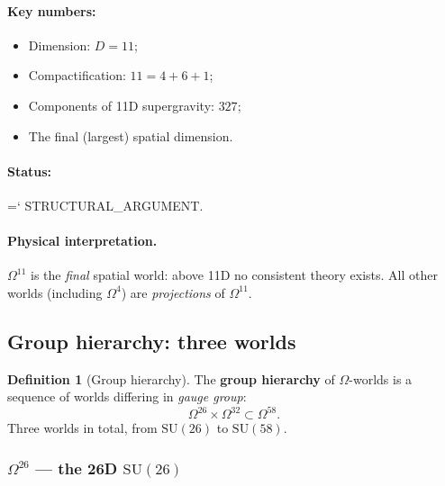 \documentclass[11pt,a4paper]{article}
\newcommand{\SU}{\mathrm{SU}}
\newcommand{\Om}{\Omega^4}
\newcommand{\Ome}{\Omega^{11}}
\newcommand{\Omtw}{\Omega^{26}}
\newcommand{\Omth}{\Omega^{32}}
\newcommand{\Omfi}{\Omega^{58}}
\renewcommand{\texttt}[1]{{\ttfamily\hyphenchar\font=`\- #1}}
\theoremstyle{definition}
\newtheorem{definition}[theorem]{Definition}
\begin{document}
\paragraph{Key numbers:}
\begin{itemize}
    \item Dimension: $D = 11$;
    \item Compactification: $11 = 4 + 6 + 1$;
    \item Components of 11D supergravity: $327$;
    \item The final (largest) spatial dimension.
\end{itemize}

\paragraph{Status:} \texttt{STRUCTURAL\_ARGUMENT}.

\paragraph{Physical interpretation.}
$\Ome$ is the \emph{final} spatial world: above 11D 
no consistent theory exists. All other worlds 
(including $\Om$) are \emph{projections} of $\Ome$.

\subsection{Group hierarchy: three worlds}
\label{subsec:group-hierarchy}

\begin{definition}[Group hierarchy]
\label{def:group-hierarchy}
The \textbf{group hierarchy} of $\Omega$-worlds is a 
sequence of worlds differing in \emph{gauge 
group}:
\begin{equation}
    \Omtw \times \Omth \subset \Omfi.
\end{equation}
Three worlds in total, from $\SU(26)$ to $\SU(58)$.
\end{definition}

\subsubsection{$\Omtw$ — the 26D $\SU(26)$}
\end{document}
